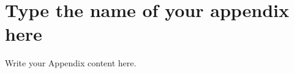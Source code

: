 
\chapter{Type the name of your appendix here} %

\label{AppendixX} %

Write your Appendix content here.